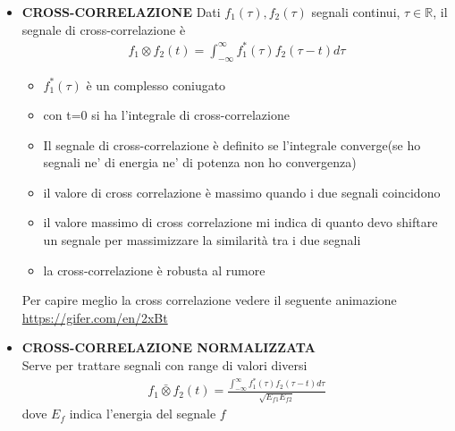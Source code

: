 \begin{itemize}
\begin{center}
\begin{minipage}{.5\textwidth}
\begin{minipage}{.5\textwidth}
                \end{minipage}
            \end{minipage}
        \end{center}
        \item \textbf{CROSS-CORRELAZIONE}
        Dati $f_1(\tau), f_2(\tau)$ segnali continui, $\tau\in\mathbb{R}$, il segnale di cross-correlazione è
        \begin{align*}
            f_1\otimes f_2(t)=\int_{-\infty}^{\infty} f^{*}_{1}(\tau)f_{2}(\tau-t)d\tau
        \end{align*}
            \begin{itemize}
                \item $f^{*}_{1}(\tau)$ è un complesso coniugato
                \item con t=0 si ha l'integrale di cross-correlazione
                \item Il segnale di cross-correlazione è definito se l'integrale converge(se ho segnali ne' di energia ne' di potenza non ho convergenza)
                \item il valore di cross correlazione è massimo quando i due segnali coincidono
                \item il valore massimo  di cross correlazione mi indica di quanto devo shiftare un segnale per massimizzare la similarità tra i due segnali
                \item la cross-correlazione è robusta al rumore
            \end{itemize}
            Per capire meglio la cross correlazione vedere il seguente animazione\\ \url{https://gifer.com/en/2xBt}
        \newpage
        \noindent
        \item \textbf{CROSS-CORRELAZIONE NORMALIZZATA}\\
        Serve per trattare segnali con range di valori diversi
        \begin{align*}
            f_1\bar{\otimes}f_2(t)=\frac{\int_{-\infty}^{\infty} f^{*}_{1}(\tau)f_{2}(\tau-t)d\tau}{\sqrt{E_{f1}E_{f2}}}
        \end{align*}
        dove $E_f$ indica l'energia del segnale $f$
            \begin{itemize}

\end{itemize}
\end{itemize}

